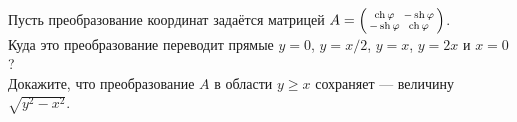 \documentclass[a4paper,12pt]{article}
\newcommand{\smat}[1]{\hr{\begin{smallmatrix}#1\end{smallmatrix}}}
\newcommand{\мв}{\,м$_в$}
\begin{document}
Пусть преобразование координат задаётся матрицей $A = \smat{\ch\ph&-\sh\ph\\-\sh\ph&\ch\ph}$.
\\
Куда это преобразование переводит прямые $y=0$, $y=x/2$, $y=x$, $y=2x$ и $x=0$?
\\
Докажите, что преобразование $A$ в области $y\ge x$ сохраняет  --- величину $\sqrt{y^2-x^2}$.


\end{document}
